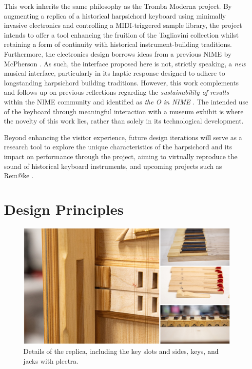 This work inherits the same philosophy as the Tromba Moderna project. By augmenting a replica of a historical harpsichord keyboard using minimally invasive electronics and controlling a MIDI-triggered sample library, the project intends to offer a tool enhancing the fruition of the Tagliavini collection whilst retaining a form of continuity with historical instrument-building traditions. Furthermore, the electronics design borrows ideas from a previous NIME by McPherson \cite{McPherson2013}. As such, the interface proposed here is not, strictly speaking, a \emph{new} musical interface, particularly in its haptic response designed to adhere to longstanding harpsichord building traditions. However, this work complements and follows up on previous reflections regarding the \emph{sustainability of results} within the NIME community and identified as \emph{the O in NIME} \cite{Masu_NIME_2023}. The intended use of the keyboard through meaningful interaction with a museum exhibit is where the novelty of this work lies, rather than solely in its technological development. 

Beyond enhancing the visitor experience, future design iterations will serve as a research tool to explore the unique characteristics of the harpsichord and its impact on performance through the  project, aiming to virtually reproduce the sound of historical keyboard instruments, and upcoming projects such as Rem@ke \cite{remake1}.

\section{Design Principles}\label{design}

\begin{figure}
\includegraphics[width=\linewidth]{src/images/details.jpg}
\caption{Details of the replica, including the key slots and sides, keys, and jacks with plectra.}\label{fig:details}
\end{figure}

